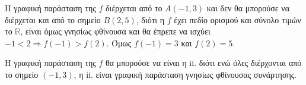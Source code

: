\begin{alist}
\item Η γραφική παράσταση της $f$ διέρχεται από το $A(-1,3)$ και δεν θα μπορούσε να διέρχεται και από το σημείο $B(2,5)$, διότι η $f$ έχει πεδίο ορισμού και σύνολο τιμών το $\mathbb{R}$, είναι όμως γνησίως φθίνουσα και θα έπρεπε να ισχύει $-1 < 2 \Rightarrow f(-1) > f(2)$. Όμως $f(-1)=3$ και $f(2)=5$.
\item Η γραφική παράσταση της $f$ θα μπορούσε να είναι η ii. διότι ενώ όλες διέρχονται από το σημείο $(-1,3)$, η ii. είναι γραφική παράσταση γνησίως φθίνουσας συνάρτησης.
\end{alist}

